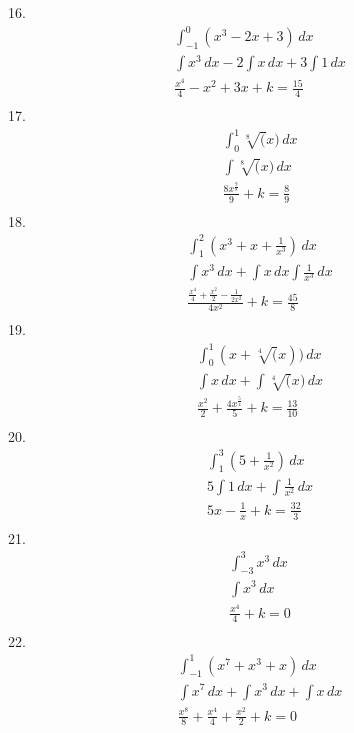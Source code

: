 \documentclass{article}
\begin{document}
16.
\begin{gather*}
    \int_{-1}^{0} (x^3-2x+3)\, dx
\\
    \int x^3\,dx - 2\int x \,dx + 3\int 1\,dx
\\
    \frac{x^4}{4} - x^2 + 3x + k = \frac{15}{4}
\\
\end{gather*}
17.
\begin{gather*}
    \int_{0}^{1} \sqrt[8](x)\, dx
\\
    \int \sqrt[8](x)\, dx
\\
    \frac{8x^{\frac{9}{8}}}{9} + k = \frac{8}{9}
\\
\end{gather*}
18.
\begin{gather*}
    \int_{1}^{2} (x^3 + x + \frac{1}{x^3})\, dx
\\
    \int x^3\, dx + \int x\, dx \int \frac{1}{x^3}\, dx
\\
    \frac{\frac{x^4}{4} + \frac{x^2}{2} - \frac{1}{2x^2}}{4x^2} + k = \frac{45}{8}
\\
\end{gather*}
19.
\begin{gather*}
    \int_{0}^{1} (x+\sqrt[4](x))\, dx
\\
    \int x\, dx + \int \sqrt[4](x)\, dx
\\
    \frac{x^2}{2} + \frac{4x^{\frac{5}{4}}}{5} + k = \frac{13}{10}
\\
\end{gather*}
20.
\begin{gather*}
    \int_{1}^{3} (5+\frac{1}{x^2})\, dx
\\
    5\int 1\, dx + \int \frac{1}{x^2}\, dx
\\
    5x - \frac{1}{x} + k = \frac{32}{3}
\\
\end{gather*}
21.
\begin{gather*}
    \int_{-3}^{3} x^3\, dx
\\
    \int x^3\, dx
\\
    \frac{x^4}{4} + k = 0
\\
\end{gather*}
22.
\begin{gather*}
    \int_{-1}^{1} (x^7+x^3+x)\, dx
\\
    \int x^7\, dx + \int x^3\, dx + \int x\, dx
\\
    \frac{x^8}{8} + \frac{x^4}{4} + \frac{x^2}{2} + k = 0
\\
\end{gather*}
\end{document}
